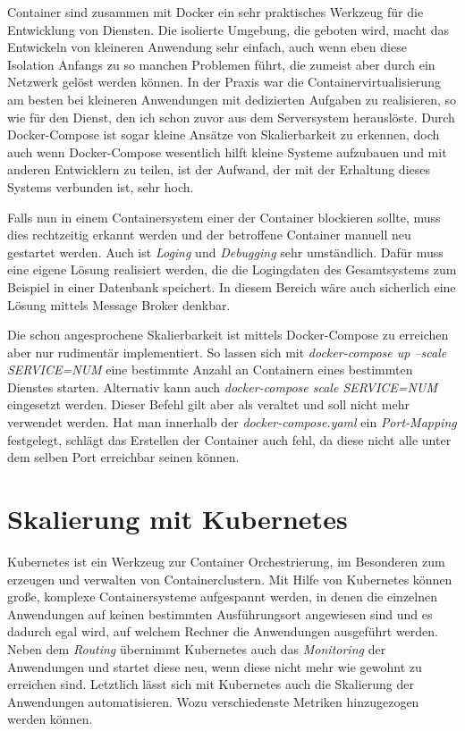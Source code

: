 \documentclass[12pt,a4paper]{scrartcl}
\begin{document}
Container sind zusammen mit Docker ein sehr praktisches Werkzeug für die Entwicklung von Diensten. Die isolierte Umgebung, die geboten wird, macht das Entwickeln von kleineren Anwendung  sehr einfach, auch wenn eben diese Isolation Anfangs zu so manchen Problemen führt, die zumeist aber durch ein Netzwerk gelöst werden können. In der Praxis war die Containervirtualisierung am besten bei kleineren Anwendungen mit dedizierten Aufgaben zu realisieren, so wie für den Dienst, den ich schon zuvor aus dem Serversystem herauslöste. Durch Docker-Compose ist sogar kleine Ansätze von Skalierbarkeit zu erkennen, doch auch wenn Docker-Compose wesentlich hilft kleine Systeme aufzubauen und mit anderen Entwicklern zu teilen, ist der Aufwand, der mit der Erhaltung dieses Systems verbunden ist, sehr hoch.

Falls nun in einem Containersystem einer der Container blockieren sollte, muss dies rechtzeitig erkannt werden und der betroffene Container manuell neu gestartet werden. Auch ist \emph{Loging} und \emph{Debugging} sehr umständlich. Dafür muss eine eigene Lösung realisiert werden, die die Logingdaten des Gesamtsystems zum Beispiel in einer Datenbank speichert. In diesem Bereich wäre auch sicherlich eine Lösung mittels Message Broker denkbar.

Die schon angesprochene Skalierbarkeit ist mittels Docker-Compose zu erreichen aber nur rudimentär implementiert. So lassen sich mit \emph{docker-compose up --scale SERVICE=NUM} eine bestimmte Anzahl an Containern eines bestimmten Dienstes starten. Alternativ kann auch \emph{docker-compose scale SERVICE=NUM} eingesetzt werden. Dieser Befehl gilt aber als veraltet und soll nicht mehr verwendet werden. Hat man innerhalb der \emph{docker-compose.yaml} ein \emph{Port-Mapping} festgelegt, schlägt das Erstellen der Container auch fehl, da diese nicht alle unter dem selben Port erreichbar seinen können.


\newpage
\section{Skalierung mit Kubernetes} \label{kubernetes}

Kubernetes ist ein Werkzeug zur Container Orchestrierung, im Besonderen zum erzeugen und verwalten von Containerclustern. Mit Hilfe von Kubernetes können große, komplexe Containersysteme aufgespannt werden, in denen die einzelnen Anwendungen auf keinen bestimmten Ausführungsort angewiesen sind und es dadurch egal wird, auf welchem Rechner die Anwendungen ausgeführt werden. Neben dem \emph{Routing} übernimmt Kubernetes auch das \emph{Monitoring} der Anwendungen und startet diese neu, wenn diese nicht mehr wie gewohnt zu erreichen sind. Letztlich lässt sich mit Kubernetes auch die Skalierung der Anwendungen automatisieren. Wozu verschiedenste Metriken hinzugezogen werden können. 
\end{document}
